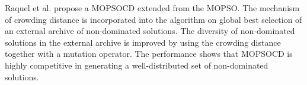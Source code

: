 Raquel et al. \cite{Raquel} propose a MOPSOCD extended from the MOPSO. 
The mechanism of crowding distance is incorporated into the algorithm on global best selection of an external 
archive of non-dominated solutions. The diversity of non-dominated solutions in the external archive is improved by 
using the crowding distance together with a mutation operator. The performance shows that MOPSOCD is highly 
competitive in generating a well-distributed set of non-dominated solutions. 




